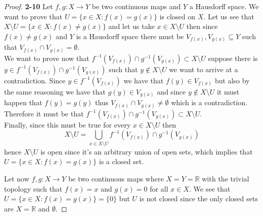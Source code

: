\documentclass[11pt]{article}
\newcommand{\R}{\mathbb{R}}
\newcommand{\setmin}{\setminus}
\theoremstyle{definition}
\begin{document}
\begin{proof}{\textbf{2-10}}
    Let $f,g: X \to Y$ be two continuous maps and $Y$ a Hausdorff space.
    We want to prove that $U = \{x \in X: f(x) = g(x)\}$ is closed on $X$.
    Let us see that $X \setmin U = \{x \in X: f(x) \neq g(x)\}$ and let us
    take $x \in X \setmin U$ then since $f(x) \neq g(x)$ and $Y$ is a Hausdorff
    space there must be $V_{f(x)}, V_{g(x)} \subseteq Y$ such that
    $V_{f(x)} \cap V_{g(x)} = \emptyset$.\\
    We want to prove now that
    $f^{-1}(V_{f(x)}) \cap g^{-1}(V_{g(x)}) \subset X \setmin U$
    suppose there is $y \in f^{-1}(V_{f(x)}) \cap g^{-1}(V_{g(x)})$ such that
    $y \not\in X \setmin U$ we want to arrive at a contradiction.
    Since $y \in f^{-1}(V_{f(x)})$ we have that
    $f(y) \in V_{f(x)}$ but also by the same reasoning we have that
    $g(y) \in V_{g(x)}$ and since $y \not\in X \setmin U$ it must happen that
    $f(y) = g(y)$ thus $V_{f(x)} \cap V_{g(x)} \neq \emptyset$ which is a
    contradiction. Therefore it must be that
    $f^{-1}(V_{f(x)}) \cap g^{-1}(V_{g(x)}) \subset X \setmin U$.\\
    Finally, since this must be true for every $x \in X \setmin U$ then
    $$X \setmin U
    = \bigcup_{x \in X \setmin U} f^{-1}(V_{f(x)}) \cap g^{-1}(V_{g(x)})$$
    hence $X \setmin U$ is open since it's an arbitrary union of open sets,
    which implies that $U = \{x \in X: f(x) = g(x)\}$ is a closed set.

    Let now $f,g:X \to Y$ be two continuous maps where $X = Y = \R$ with the
    trivial topology such that $f(x)=x$ and $g(x) = 0$ for all $x \in X$.
    We see that $U = \{x \in X: f(x) = g(x)\} = \{0\}$ but $U$ is not closed
    since the only closed sets are $X = \R$ and $\emptyset$.
\end{proof}
\cleardoublepage
\end{document}
